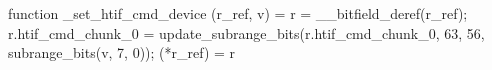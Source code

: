 function _set_htif_cmd_device (r_ref, v) = {
    r = __bitfield_deref(r_ref);
    r.htif_cmd_chunk_0 = update_subrange_bits(r.htif_cmd_chunk_0, 63, 56, subrange_bits(v, 7, 0));
    (*r_ref) = r
}
